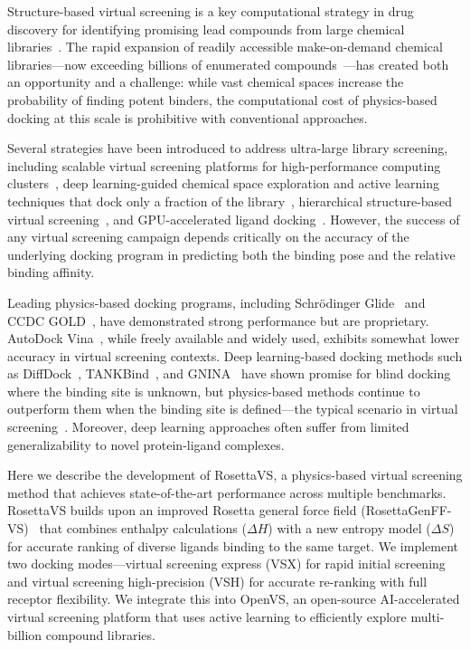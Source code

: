 \documentclass[11pt]{article}
\begin{document}
Structure-based virtual screening is a key computational strategy in drug discovery for identifying promising lead compounds from large chemical libraries~\citep{lyu2019ultra,gorgulla2020open}. The rapid expansion of readily accessible make-on-demand chemical libraries---now exceeding billions of enumerated compounds~\citep{tingle2023zinc22}---has created both an opportunity and a challenge: while vast chemical spaces increase the probability of finding potent binders, the computational cost of physics-based docking at this scale is prohibitive with conventional approaches.

Several strategies have been introduced to address ultra-large library screening, including scalable virtual screening platforms for high-performance computing clusters~\citep{gorgulla2020open}, deep learning-guided chemical space exploration and active learning techniques that dock only a fraction of the library~\citep{gentile2020deep,graff2021accelerating,yang2021efficient,gentile2022artificial}, hierarchical structure-based virtual screening~\citep{sadybekov2022synthon}, and GPU-accelerated ligand docking~\citep{gpu_docking2023}. However, the success of any virtual screening campaign depends critically on the accuracy of the underlying docking program in predicting both the binding pose and the relative binding affinity.

Leading physics-based docking programs, including Schr\"{o}dinger Glide~\citep{friesner2004glide,halgren2004glide,friesner2006extra} and CCDC GOLD~\citep{jones1997gold}, have demonstrated strong performance but are proprietary. AutoDock Vina~\citep{trott2010autodock}, while freely available and widely used, exhibits somewhat lower accuracy in virtual screening contexts. Deep learning-based docking methods such as DiffDock~\citep{corso2023diffdock}, TANKBind~\citep{lu2022tankbind}, and GNINA~\citep{mcnutt2021gnina} have shown promise for blind docking where the binding site is unknown, but physics-based methods continue to outperform them when the binding site is defined---the typical scenario in virtual screening~\citep{volkov2022frustration}. Moreover, deep learning approaches often suffer from limited generalizability to novel protein-ligand complexes.

Here we describe the development of RosettaVS, a physics-based virtual screening method that achieves state-of-the-art performance across multiple benchmarks. RosettaVS builds upon an improved Rosetta general force field (RosettaGenFF-VS)~\citep{park2021force} that combines enthalpy calculations ($\Delta H$) with a new entropy model ($\Delta S$) for accurate ranking of diverse ligands binding to the same target. We implement two docking modes---virtual screening express (VSX) for rapid initial screening and virtual screening high-precision (VSH) for accurate re-ranking with full receptor flexibility. We integrate this into OpenVS, an open-source AI-accelerated virtual screening platform that uses active learning to efficiently explore multi-billion compound libraries.
\end{document}
